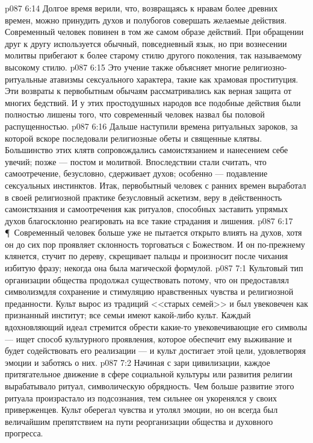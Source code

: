 \vs p087 6:14 Долгое время верили, что, возвращаясь к нравам более древних времен, можно принудить духов и полубогов совершать желаемые действия. Современный человек повинен в том же самом образе действий. При обращении друг к другу используется обычный, повседневный язык, но при вознесении молитвы прибегают к более старому стилю другого поколения, так называемому высокому стилю.
\vs p087 6:15 Это учение также объясняет многие религиозно\hyp{}ритуальные атавизмы сексуального характера, такие как храмовая проституция. Эти возвраты к первобытным обычаям рассматривались как верная защита от многих бедствий. И у этих простодушных народов все подобные действия были полностью лишены того, что современный человек назвал бы половой распущенностью.
\vs p087 6:16 Дальше наступили времена ритуальных зароков, за которой вскоре последовали религиозные обеты и священные клятвы. Большинство этих клятв сопровождались самоистязанием и нанесением себе увечий; позже --- постом и молитвой. Впоследствии стали считать, что самоотречение, безусловно, сдерживает духов; особенно --- подавление сексуальных инстинктов. Итак, первобытный человек с ранних времен выработал в своей религиозной практике безусловный аскетизм, веру в действенность самоистязания и самоотречения как ритуалов, способных заставить упрямых духов благосклонно реагировать на все такие страдания и лишения.
\vs p087 6:17 \P\ Современный человек больше уже не пытается открыто влиять на духов, хотя он до сих пор проявляет склонность торговаться с Божеством. И он по\hyp{}прежнему клянется, стучит по дереву, скрещивает пальцы и произносит после чихания избитую фразу; некогда она была магической формулой.
\vs p087 7:1 Культовый тип организации общества продолжал существовать потому, что он предоставлял символизмдля сохранение и стимуляцию нравственных чувства и религиозной преданности. Культ вырос из традиций <<старых семей>> и был увековечен как признанный институт; все семьи имеют какой\hyp{}либо культ. Каждый вдохновляющий идеал стремится обрести какие\hyp{}то увековечивающие его символы --- ищет способ культурного проявления, которое обеспечит ему выживание и будет содействовать его реализации --- и культ достигает этой цели, удовлетворяя эмоции и заботясь о них.
\vs p087 7:2 Начиная с зари цивилизации, каждое притягательное движение в сфере социальной культуры или развития религии вырабатывало ритуал, символическую обрядность. Чем больше развитие этого ритуала произрастало из подсознания, тем сильнее он укоренялся у своих приверженцев. Культ оберегал чувства и утолял эмоции, но он всегда был величайшим препятствием на пути реорганизации общества и духовного прогресса.
